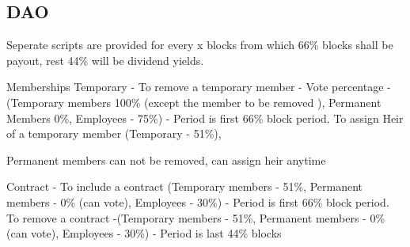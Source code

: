 \documentclass[../Bitcoin Blink.tex]{subfiles}
\begin{document}
\normalsize
\subsection{DAO}

Seperate scripts are provided for every x blocks from which 66\% blocks shall be payout, rest 44\% will be dividend yields.

Memberships 
Temporary - To remove a temporary member - Vote percentage - (Temporary members 100\% (except the member to be removed ), Permanent Members 0\%, Employees - 75\%) - Period is first 66\% block period.
			To assign Heir of a temporary member (Temporary - 51\%), 
			
Permanent members can not be removed, can assign heir anytime

Contract - To include a contract (Temporary members - 51\%, Permanent members - 0\% (can vote), Employees - 30\%) - Period is first 66\% block period.
			To remove a contract -(Temporary members - 51\%, Permanent members - 0\% (can vote), Employees - 30\%) - Period is last 44\% blocks
\end{document}
